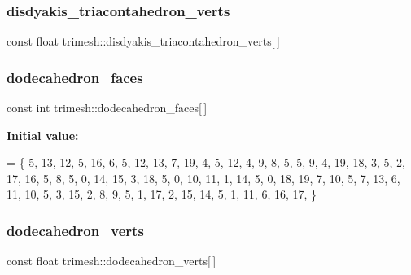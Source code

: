 \subsubsection{\texorpdfstring{disdyakis\+\_\+triacontahedron\+\_\+verts}{disdyakis\_triacontahedron\_verts}}
{\footnotesize\ttfamily const float trimesh\+::disdyakis\+\_\+triacontahedron\+\_\+verts\mbox{[}$\,$\mbox{]}\hspace{0.3cm}{\ttfamily [static]}}

\mbox{\label{namespacetrimesh_a4e582a44ae8218e36703d98252fff8f1}} 
\subsubsection{\texorpdfstring{dodecahedron\+\_\+faces}{dodecahedron\_faces}}
{\footnotesize\ttfamily const int trimesh\+::dodecahedron\+\_\+faces\mbox{[}$\,$\mbox{]}\hspace{0.3cm}{\ttfamily [static]}}

{\bfseries Initial value\+:}
\begin{DoxyCode}
= \{
    5, 13, 12, 5, 16, 6,
    5, 12, 13, 7, 19, 4,
    5, 12, 4, 9, 8, 5,
    5, 9, 4, 19, 18, 3,
    5, 2, 17, 16, 5, 8,
    5, 0, 14, 15, 3, 18,
    5, 0, 10, 11, 1, 14,
    5, 0, 18, 19, 7, 10,
    5, 7, 13, 6, 11, 10,
    5, 3, 15, 2, 8, 9,
    5, 1, 17, 2, 15, 14,
    5, 1, 11, 6, 16, 17,
\}
\end{DoxyCode}
\mbox{\label{namespacetrimesh_a07c136c3bb7adf31d11f25a808e7205d}} 
\subsubsection{\texorpdfstring{dodecahedron\+\_\+verts}{dodecahedron\_verts}}
{\footnotesize\ttfamily const float trimesh\+::dodecahedron\+\_\+verts\mbox{[}$\,$\mbox{]}\hspace{0.3cm}{\ttfamily [static]}}

